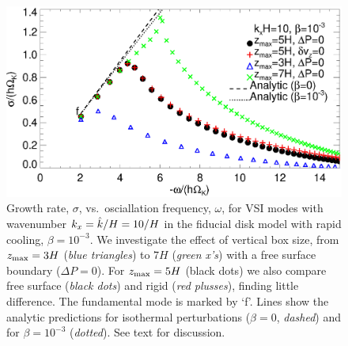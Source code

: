 

\begin{figure}
  \includegraphics[width=\linewidth]{figures/compare_modes_iso_kx10_analytic.ps}
  \caption{Growth rate, $\sigma$, vs.\ osciallation frequency, $\omega$, for
  VSI modes with wavenumber $k_x = \hat{k}/H=10/H$ in the fiducial disk model
    with rapid cooling, $\beta=10^{-3}$. %
We investigate the effect of vertical box size, from $z_\mathrm{max}=3H$ (\emph{blue triangles}) to $7H$ (\emph{green x's})
    with a free surface boundary ($\Delta P=0$).  For $z_\mathrm{max}=5H$  (black dots) we also compare free surface (\emph{black dots}) and rigid (\emph{red plusses}), finding little difference.
      The fundamental mode is marked by `f'. Lines show the analytic predictions for
      isothermal perturbations ($\beta = 0$, \emph{dashed}) and for $\beta = 10^{-3}$ (\emph{dotted}).
      See text for discussion.
    \label{compare_modes_iso_kx10} 
  }
\end{figure}

